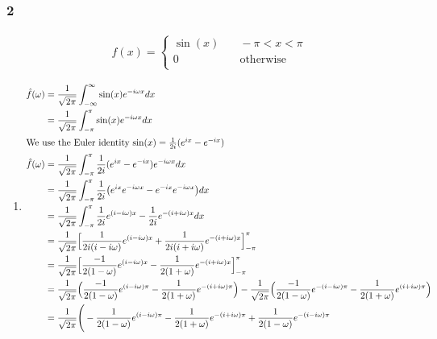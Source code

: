 \documentclass[a4paper]{article}
\newcommand{\ex}[1]{\subsubsection*{#1}}
\begin{document}
\ex{2}

\begin{align}
f(x) = 
    \begin{cases}
        \sin(x) &\quad -\pi < x < \pi \\
        0 &\quad \text{otherwise} \\
    \end{cases}
\end{align}

\begin{enumerate}[label=\alph*)]
    \item {
        \begin{align}
            \hat f(\omega ) &= \frac{1}{\sqrt{2\pi}} \int_{-\infty}^\infty{ 
                \sin(x) e^{-i\omega x} dx} \\
            &= \frac{1}{\sqrt{2\pi}} \int_{-\pi}^\pi{\sin(x) e^{-i\omega x} dx} \\
            \intertext{We use the Euler identity \(\sin(x) = \frac{1}{2i}(e^{ix}
                - e^{-ix})\)}
            \hat f(\omega ) &= \frac{1}{\sqrt{2\pi}} \int_{-\pi}^\pi{ \frac{1}{2i}(e^{ix}
                - e^{-ix}) e^{-i\omega x} dx} \\
            &= \frac{1}{\sqrt{2\pi}} \int_{-\pi}^\pi{ \frac{1}{2i}\big( e^{ix}e^{-i\omega x}
                - e^{-ix} e^{-i\omega x}\big) dx} \\
            &= \frac{1}{\sqrt{2\pi}} \int_{-\pi}^\pi{ \frac{1}{2i} e^{(i-i\omega )x}
                - \frac{1}{2i} e^{-(i+i\omega )x} dx} \\
            &= \frac{1}{\sqrt{2\pi}} \Big[\frac{1}{2i(i-i\omega )} e^{(i-i\omega )x} 
                + \frac{1}{2i(i+i\omega )} e^{-(i+i\omega )x} \Big]_{-\pi}^\pi \\
            &= \frac{1}{\sqrt{2\pi}} \Big[\frac{-1}{2(1-\omega )} e^{(i-i\omega )x} 
                - \frac{1}{2(1+\omega )} e^{-(i+i\omega )x} \Big]_{-\pi}^\pi \\
            &= \frac{1}{\sqrt{2\pi}} \Big(\frac{-1}{2(1-\omega )} e^{(i-i\omega )\pi} 
                - \frac{1}{2(1+\omega )} e^{-(i+i\omega )\pi} \Big)
                - \frac{1}{\sqrt{2\pi}} \Big(\frac{-1}{2(1-\omega )} e^{-(i-i\omega )\pi} 
                - \frac{1}{2(1+\omega )} e^{(i+i\omega )\pi} \Big) \\
            &= \frac{1}{\sqrt{2\pi}} \Bigg( 
                - \frac{1}{2(1-\omega )} e^{(i-i\omega )\pi} 
                - \frac{1}{2(1+\omega )} e^{-(i+i\omega )\pi} 
                + \frac{1}{2(1-\omega )} e^{-(i-i\omega )\pi} 

\end{align}}
\end{enumerate}
\end{document}
